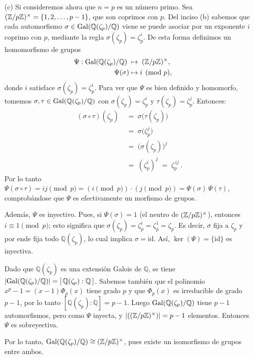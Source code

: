 \begin{solucion}
    
\noindent (c) Si consideremos ahora que $n=p$ es un número primo. Sea $(\mathbb{Z}/p\mathbb{Z})^{\times} = \{1,2,\dots,p-1\}$, que son coprimos con $p$. Del inciso (b) sabemos que cada automorfismo $\sigma \in \mathrm{Gal}(\mathbb Q(\zeta_p)/\mathbb Q)$ viene se puede asociar por un exponente $i$ coprimo con $p$, mediante la regla $\sigma(\zeta_p) = \zeta_p^i$. De esta forma definimos un homomorfismo de grupos 
\begin{align*}
\Psi: \mathrm{Gal}(\mathbb Q(\zeta_p)/\mathbb Q)\;&\mapsto\;(\mathbb{Z}/p\mathbb{Z})^{\times}, \mathbb \qquad \\
\Psi(\sigma) &\mapsto i \pmod{p}, \
\end{align*}
donde $i$ satisface $\sigma(\zeta_p)=\zeta_p^i$. Para ver que $\Psi$ es bien definido y homomorfo, tomemos $\sigma,\tau \in \mathrm{Gal}(\mathbb Q(\zeta_p)/\mathbb Q)$ con $\sigma(\zeta_p)=\zeta_p^i$ y $\tau(\zeta_p)=\zeta_p^j$. Entonces:
\begin{align*}
(\sigma\circ\tau)(\zeta_p) \;&=\; \sigma\big(\tau(\zeta_p)\big)\\ \;&=\; \sigma\!\big(\zeta_p^j\big) \\
\;&=\;\big(\sigma(\zeta_p)\big)^j\\ \;&=\; (\zeta_p^i)^j \;=\; \zeta_p^{\,ij}\,. 
\end{align*}
Por lo tanto $\Psi(\sigma\circ\tau) = ij \pmod{p} = (i \pmod{p})\cdot(j \pmod{p}) = \Psi(\sigma)\,\Psi(\tau)$, comprobándose que $\Psi$ es efectivamente un morfismo de grupos. 

Además, $\Psi$ es inyectivo. Pues, si $\Psi(\sigma)=1$ (el neutro de $(\mathbb{Z}/p\mathbb{Z})^{\times}$), entonces $i\equiv 1\pmod{p}$; esto significa que $\sigma(\zeta_p) = \zeta_p^i = \zeta_p^1 = \zeta_p$. Es decir, $\sigma$ fija a $\zeta_p$ y por ende fija todo $\mathbb Q(\zeta_p)$, lo cual implica $\sigma = \mathrm{id}$. Así, $\ker(\Psi)=\{\mathrm{id}\}$ es inyectiva. 

Dado que $\mathbb Q(\zeta_p)$ es una extensión Galois de $\mathbb Q$, se tiene $|\mathrm{Gal}(\mathbb Q(\zeta_p)/\mathbb Q)| = [\,\mathbb Q(\zeta_p):\mathbb Q\,]$. Sabemos también que el polinomio $x^p-1 = (x-1)\Phi_p(x)$ tiene grado $p$ y que $\Phi_p(x)$ es irreducible de grado $p-1$, por lo tanto $[\mathbb Q(\zeta_p):\mathbb Q] = p-1$. Luego $\mathrm{Gal}(\mathbb Q(\zeta_p)/\mathbb Q)$ tiene $p-1$ automorfismos, pero como $\Psi$ inyecta, y $|((\mathbb{Z}/p\mathbb{Z})^{\times})| = p-1$ elementos. Entonces $\Psi$ es sobreyectiva.

Por lo tanto, $\mathrm{Gal}(\mathbb Q(\zeta_p)/\mathbb Q) \cong (\mathbb{Z}/p\mathbb{Z})^{\times}$, pues existe un isomorfismo de grupos entre ambos. 

\end{solucion}